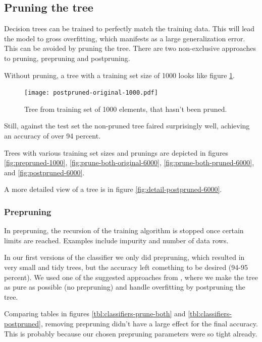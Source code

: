 \documentclass[a4paper,10pt]{article}
\begin{document}
\subsection{Pruning the tree}

Decision trees can be trained to perfectly match the training
data\cite[p. 182]{alpaydin2004}.  This will lead the model to
gross overfitting, which manifests as a large generalization error.
This can be avoided by pruning the tree.  There are two non-exclusive
approaches to pruning, prepruning and postpruning.

Without pruning, a tree with a training set size of 1000 looks like
figure \ref{fig:no-pruning-1000}.

\begin{figure}[h]
  \centering
  \begin{minipage}[c]{1.0\textwidth}
    \centering
\texttt{[image: postpruned-original-1000.pdf]}
  \end{minipage}
  \caption{Tree from training set of 1000 elements, that hasn't been
    pruned.}
  \label{fig:no-pruning-1000}
\end{figure}

Still, against the test set the non-pruned tree faired surprisingly
well, achieving an accuracy of over 94 percent.

Trees with various training set sizes and prunings are depicted in
figures \ref{fig:prepruned-1000}, \ref{fig:prune-both-original-6000},
\ref{fig:prune-both-pruned-6000}, and \ref{fig:postpruned-6000}.

A more detailed view of a tree is in figure
\ref{fig:detail-postpruned-6000}.

\subsubsection{Prepruning}

In prepruning, the recursion of the training algorithm is stopped once
certain limits are reached.  Examples include impurity and number of
data rows.

In our first versions of the classifier we only did prepruning, which
resulted in very small and tidy trees, but the accuracy left comething
to be desired (94-95 percent).  We used one of the suggested
approaches from \cite{alpaydin2004}, where we make the tree as pure as
possible (no prepruning) and handle overfitting by postpruning the tree.

Comparing tables in figures \ref{tbl:classifiers-prune-both} and
\ref{tbl:classifiers-postpruned}, removing prepruning didn't have a
large effect for the final accuracy.  This is probably because our
chosen prepruning parameters were so tight already.
\end{document}
